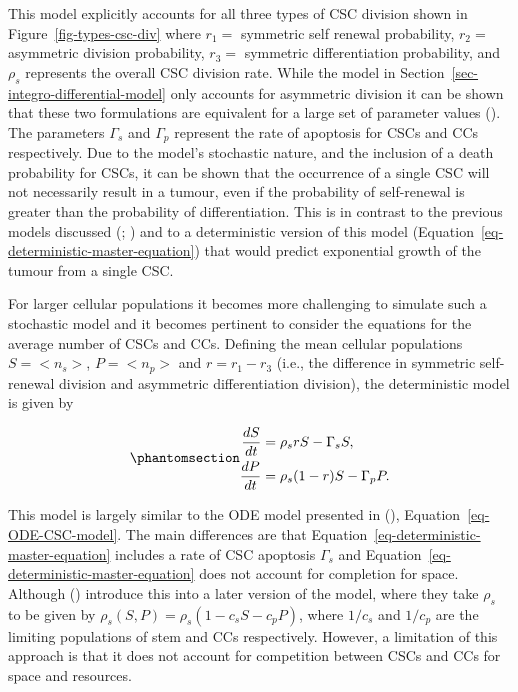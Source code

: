 \documentclass[
  letterpaper,
]{scrreprt}
\theoremstyle{definition}
\theoremstyle{remark}
\begin{document}
This model explicitly accounts for all three types of CSC division shown
in Figure~\ref{fig-types-csc-div} where \(r_1=\) symmetric self renewal
probability, \(r_2=\) asymmetric division probability, \(r_3=\)
symmetric differentiation probability, and \(\rho_s\) represents the
overall CSC division rate. While the model in
Section~\ref{sec-integro-differential-model} only accounts for
asymmetric division it can be shown that these two formulations are
equivalent for a large set of parameter values
(). The
parameters \(\Gamma_s\) and \(\Gamma_p\) represent the rate of apoptosis
for CSCs and CCs respectively. Due to the model's stochastic nature, and
the inclusion of a death probability for CSCs, it can be shown that the
occurrence of a single CSC will not necessarily result in a tumour, even
if the probability of self-renewal is greater than the probability of
differentiation. This is in contrast to the previous models discussed
(;
) and to
a deterministic version of this model
(Equation~\ref{eq-deterministic-master-equation}) that would predict
exponential growth of the tumour from a single CSC.

For larger cellular populations it becomes more challenging to simulate
such a stochastic model and it becomes pertinent to consider the
equations for the average number of CSCs and CCs. Defining the mean
cellular populations \(S = <n_s>\), \(P = <n_p>\) and \(r = r_1 - r_3\)
(i.e., the difference in symmetric self-renewal division and asymmetric
differentiation division), the deterministic model is given by

\begin{equation}\phantomsection\label{eq-deterministic-master-equation}{
\begin{aligned}
\frac{dS}{dt} &= \rho_s r S - \Gamma_s S, \\
\frac{dP}{dt} &= \rho_s (1-r) S - \Gamma_p P.
\end{aligned}
}\end{equation}

This model is largely similar to the ODE model presented in
(),
Equation~\ref{eq-ODE-CSC-model}. The main differences are that
Equation~\ref{eq-deterministic-master-equation} includes a rate of CSC
apoptosis \(\Gamma_s\) and
Equation~\ref{eq-deterministic-master-equation} does not account for
completion for space. Although () introduce this into a later version of the model, where they take
\(\rho_s\) to be given by \(\rho_s(S,P) = \rho_s(1 - c_s S - c_p P)\),
where \(1/c_s\) and \(1/c_p\) are the limiting populations of stem and
CCs respectively. However, a limitation of this approach is that it does
not account for competition between CSCs and CCs for space and
resources.
\end{document}
